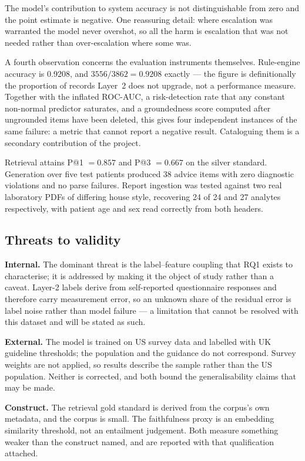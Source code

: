 \documentclass[11pt,a4paper]{article}
\begin{document}
The model's contribution to system accuracy is not distinguishable from zero and
the point estimate is negative. One reassuring detail: where escalation was
warranted the model never overshot, so all the harm is escalation that was not
needed rather than over-escalation where some was.

A fourth observation concerns the evaluation instruments themselves. Rule-engine
accuracy is 0.9208, and $3556/3862 = 0.9208$ exactly --- the figure is
definitionally the proportion of records Layer~2 does not upgrade, not a
performance measure. Together with the inflated ROC-AUC, a risk-detection rate that
any constant non-normal predictor saturates, and a groundedness score computed
after ungrounded items have been deleted, this gives four independent instances of
the same failure: a metric that cannot report a negative result. Cataloguing them
is a secondary contribution of the project.

Retrieval attains P@1 $=0.857$ and P@3 $=0.667$ on the silver standard. Generation
over five test patients produced 38 advice items with zero diagnostic violations
and no parse failures. Report ingestion was tested against two real laboratory PDFs
of differing house style, recovering 24 of 24 and 27 analytes respectively, with
patient age and sex read correctly from both headers.

\subsection{Threats to validity}

\textbf{Internal.} The dominant threat is the label--feature coupling that RQ1
exists to characterise; it is addressed by making it the object of study rather
than a caveat. Layer-2 labels derive from self-reported questionnaire responses and
therefore carry measurement error, so an unknown share of the residual error is
label noise rather than model failure --- a limitation that cannot be resolved with
this dataset and will be stated as such.

\textbf{External.} The model is trained on US survey data and labelled with UK
guideline thresholds; the population and the guidance do not correspond. Survey
weights are not applied, so results describe the sample rather than the US
population. Neither is corrected, and both bound the generalisability claims that
may be made.

\textbf{Construct.} The retrieval gold standard is derived from the corpus's own
metadata, and the corpus is small. The faithfulness proxy is an embedding
similarity threshold, not an entailment judgement. Both measure something weaker
than the construct named, and are reported with that qualification attached.
\end{document}
